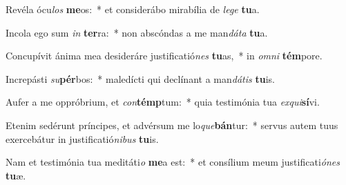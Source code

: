 \item Revéla ócu\textit{los} \textbf{me}os:~* et considerábo mirabília de \textit{le}\textit{ge} \textbf{tu}a.
\item Incola ego sum \textit{in} \textbf{ter}ra:~* non abscóndas a me man\textit{dá}\textit{ta} \textbf{tu}a.
\item Concupívit ánima mea desideráre justificatió\textit{nes} \textbf{tu}as,~* in \textit{om}\textit{ni} \textbf{tém}pore.
\item Increpásti \textit{su}\textbf{pér}bos:~* maledícti qui declínant a man\textit{dá}\textit{tis} \textbf{tu}is.
\item Aufer a me oppróbrium, et \textit{con}\textbf{témp}tum:~* quia testimónia tua \textit{ex}\textit{qui}\textbf{sí}vi.
\item Etenim sedérunt príncipes, et advérsum me lo\textit{que}\textbf{bán}tur:~* servus autem tuus exercebátur in justificatió\textit{ni}\textit{bus} \textbf{tu}is.
\item Nam et testimónia tua meditáti\textit{o} \textbf{me}a est:~* et consílium meum justificati\textit{ó}\textit{nes} \textbf{tu}æ.
